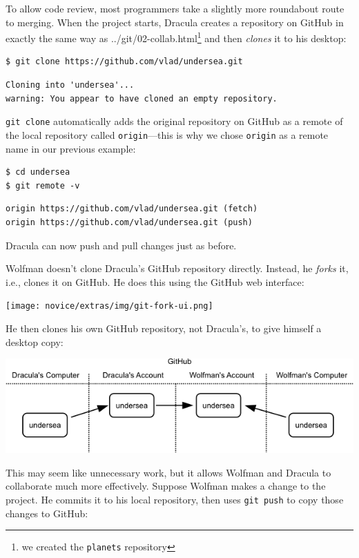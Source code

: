 \documentclass[]{book}
\newcommand{\urlfoot}[2]{{#1}\footnote{#2}}
\newcommand{\gdef}[2]{\emph{#2}}
\begin{document}
To allow code review, most programmers take a slightly more roundabout
route to merging. When the project starts, Dracula creates a repository
on GitHub in exactly the same way as \urlfoot{../git/02-collab.html}{we
created the \texttt{planets} repository} and then
\gdef{g:repository-clone}{clones} it to his desktop:

\begin{verbatim}
$ git clone https://github.com/vlad/undersea.git
\end{verbatim}

\begin{verbatim}
Cloning into 'undersea'...
warning: You appear to have cloned an empty repository.
\end{verbatim}

\texttt{git clone} automatically adds the original repository on GitHub
as a remote of the local repository called \texttt{origin}---this is why
we chose \texttt{origin} as a remote name in our previous example:

\begin{verbatim}
$ cd undersea
$ git remote -v
\end{verbatim}

\begin{verbatim}
origin https://github.com/vlad/undersea.git (fetch)
origin https://github.com/vlad/undersea.git (push)
\end{verbatim}

Dracula can now push and pull changes just as before.

Wolfman doesn't clone Dracula's GitHub repository directly. Instead, he
\gdef{g:repository-fork}{forks} it, i.e., clones it on GitHub. He
does this using the GitHub web interface:

\texttt{[image: novice/extras/img/git-fork-ui.png]}

He then clones his own GitHub repository, not Dracula's, to give himself
a desktop copy:

\includegraphics{novice/extras/img/git-forking-01.png}

This may seem like unnecessary work, but it allows Wolfman and Dracula
to collaborate much more effectively. Suppose Wolfman makes a change to
the project. He commits it to his local repository, then uses
\texttt{git push} to copy those changes to GitHub:
\end{document}
